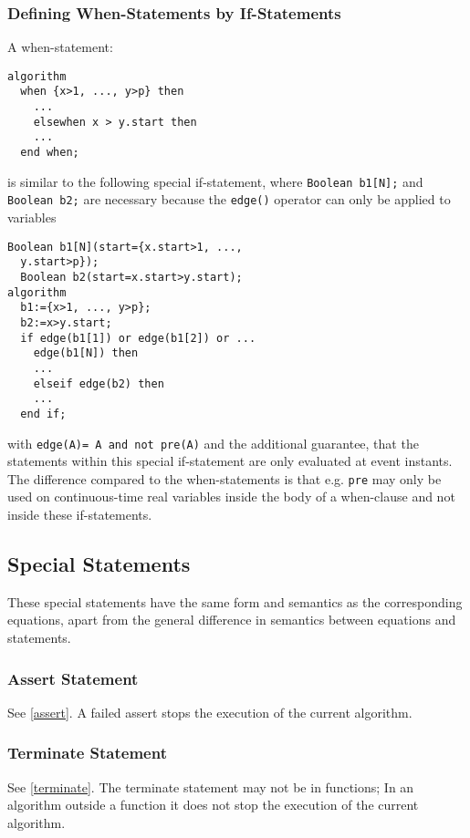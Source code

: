 \subsubsection{Defining When-Statements by If-Statements}

A when-statement:

\begin{lstlisting}[language=modelica]
algorithm
  when {x>1, ..., y>p} then
    ...
    elsewhen x > y.start then
    ...
  end when;
\end{lstlisting}
is similar to the following special if-statement, where \lstinline!Boolean b1[N];! and \lstinline!Boolean b2;! are necessary because the \lstinline!edge()! operator can
only be applied to variables

\begin{lstlisting}[language=modelica]
  Boolean b1[N](start={x.start>1, ...,
  y.start>p});
  Boolean b2(start=x.start>y.start);
algorithm
  b1:={x>1, ..., y>p};
  b2:=x>y.start;
  if edge(b1[1]) or edge(b1[2]) or ...
    edge(b1[N]) then
    ...
    elseif edge(b2) then
    ...
  end if;
\end{lstlisting}
with \lstinline!edge(A)= A and not pre(A)! and the additional guarantee, that the
statements within this special if-statement are only evaluated at event
instants. The difference compared to the when-statements is that e.g. \lstinline!pre! may only be used on continuous-time real variables inside the body
of a when-clause and not inside these if-statements.

\subsection{Special Statements}

These special statements have the same form and semantics as the
corresponding equations, apart from the general difference in semantics
between equations and statements.

\subsubsection{Assert Statement}

See \autoref{assert}. A failed assert stops the execution of the current
algorithm.

\subsubsection{Terminate Statement}

See \autoref{terminate}. The terminate statement may not be in functions; In
an algorithm outside a function it does not stop the execution of the
current algorithm.
